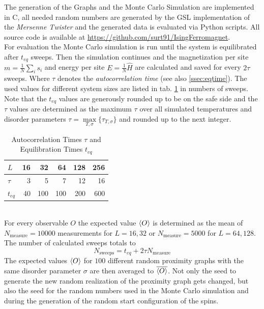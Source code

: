 The generation of the Graphs and the Monte Carlo Simulation are implemented
in C, all needed random numbers are generated by the GSL \cite{GSL}
implementation of the \emph{Mersenne Twister} \cite{Matsumoto1998} and
the generated data is evaluated via Python scripts.
All source code is available at \url{https://github.com/surt91/IsingFerromagnet}.\\

For evaluation the Monte Carlo simulation is run until the system
is equilibrated after \(t_{eq}\) sweeps. Then the simulation continues
and the magnetization per site \(m=\frac{1}{N}\sum_i s_i\) and energy
per site \(E=\frac{1}{N}\hat H\) are calculated and saved for every
\(2\tau\) sweeps. Where \(\tau\) denotes the \emph{autocorrelation time}
(see also \ref{ssec:eqtime}). The used values for different system sizes
are listed in tab. \ref{tab:tauAndTeq} in numbers of sweeps. Note that
the \(t_{eq}\) values are generously rounded up to be on the safe side
and the \(\tau\) values are determined as the maximum \(\tau\) over all
simulated temperatures and disorder parameters \(\tau = \underset{T,\sigma}{\max} \{\tau_{T,\sigma}\}\)
and rounded up to the next integer.
\begin{table}[htbp]
    \center
    \begin{tabular}{l r r r r r}
        \toprule
        \(L\)    & 16 &  32 &  64 & 128 & 256\\
        \midrule
        \(\tau\) &  3 &   5 &   7 &  12 &  16\\
        \(t_{eq}\) & 40 & 100 & 100 & 200 & 600\\
        \bottomrule
    \end{tabular}
    \caption{Autocorrelation Times $\tau$ and Equilibration Times $t_{eq}$}
    \label{tab:tauAndTeq}
\end{table}\\
For every observable \(O\) the expected value \(\left< O \right>\) is determined
as the mean of \(N_{\mathrm{measure}}=10000\) measurements for \(L=16,32\)
or \(N_{\mathrm{measure}}=5000\) for \(L=64,128\). The number of
calculated sweeps totals to
\[N_{\mathrm{sweeps}}=t_{eq}+2\tau N_{\mathrm{measure}}\]
The expected values \(\left< O \right>\) for \(100\) different random proximity
graphs with the same disorder parameter \(\sigma\) are then averaged to
\(\overline{\left< O \right>}\). Not only the seed to generate the new random
realization of the proximity graph gets changed, but also the seed for
the random numbers used in the Monte Carlo simulation and during the
generation of the random start configuration of the spins.\\
